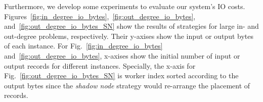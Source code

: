 \documentclass[conference]{IEEEtran}
\begin{document}
Furthermore, we develop some experiments to evaluate our system's IO costs.
Figures~\ref{fig:in_degree_io_bytes},~\ref{fig:out_degree_io_bytes}, and~\ref{fig:out_degree_io_bytes_SN} show the results of strategies for large in- and out-degree problems, respectively.
Their y-axises show the input or output bytes of each instance.
For Fig.~\ref{fig:in_degree_io_bytes} and~\ref{fig:out_degree_io_bytes}, x-axises show the initial number of input or output records for different instances.
Specially, the x-axis for Fig.~\ref{fig:out_degree_io_bytes_SN} is worker index sorted according to the output bytes since the \emph{shadow node} strategy would re-arrange the placement of records. 
\end{document}
